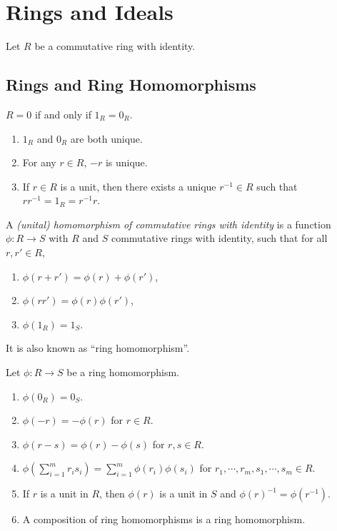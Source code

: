 \chapter{Rings and Ideals}

Let $R$ be a commutative ring with identity.

\section*{Rings and Ring Homomorphisms}

\begin{fact}\label{1.1}
    $R = 0$ if and only if $1_R = 0_R$.
\end{fact}

\begin{fact}\label{1.2}
    \begin{enumerate}
        \item\label{1.2a} $1_R$ and $0_R$ are both unique.
        \item\label{1.2b} For any $r \in R$, $-r$ is unique.
        \item\label{1.2c} If $r \in R$ is a unit, then there exists a unique $r^{-1} \in R$ such that $rr^{-1} = 1_R = r^{-1}r$.
    \end{enumerate}
\end{fact}

\begin{definition}\label{1.3} 
    A \emph{(unital) homomorphism of commutative rings with identity} is a function $\phi: R \to S$ with $R$ and $S$ commutative rings with identity, such that for all $r,r' \in R$,
    \begin{enumerate}
        \item $\phi(r+r') = \phi(r) + \phi(r')$,
        \item $\phi(rr') = \phi(r) \phi(r')$,
        \item $\phi(1_R) = 1_S$.
    \end{enumerate}
    It is also known as ``ring homomorphism''.
\end{definition}

\begin{fact}\label{1.4}
    Let $\phi: R \to S$ be a ring homomorphism.
    \begin{enumerate}
        \item $\phi(0_R) = 0_S$.
        \item $\phi(-r) = -\phi(r)$ for $r \in R$.
        \item $\phi(r-s) = \phi(r) - \phi(s)$ for $r,s \in R$.
        \item $\phi(\sum_{i=1}^mr_is_i) = \sum_{i=1}^m\phi(r_i)\phi(s_i)$ for $r_1,\cdots,r_m,s_1,\cdots,s_m \in R$.
        \item If $r$ is a unit in $R$, then $\phi(r)$ is a unit in $S$ and $\phi(r)^{-1} = \phi(r^{-1})$.
        \item A composition of ring homomorphisms is a ring homomorphism.
    \end{enumerate}
\end{fact}

